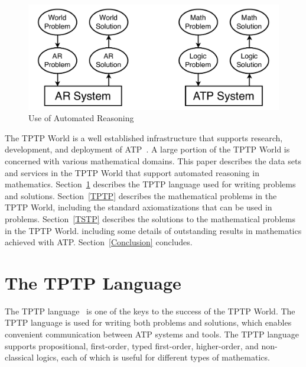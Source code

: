 \documentclass[runningheads]{llncs}
\begin{document}
\begin{figure}[htb]
\centering
\includegraphics[width=1.0\textwidth]{UseOfAR.pdf}
\vspace*{-1em}
\caption{Use of Automated Reasoning}
\label{UseOfAR}
\end{figure}

The TPTP World is a well established infrastructure that supports research, development, and 
deployment of ATP~\cite{Sut10,Sut17}.
A large portion of the TPTP World is concerned with various mathematical domains.
This paper describes the data sets and services in the TPTP World that support automated reasoning
in mathematics.
Section~\ref{Languages} describes the TPTP language used for writing problems and solutions.
Section~\ref{TPTP} describes the mathematical problems in the TPTP World, including the standard 
axiomatizations that can be used in problems.
Section~\ref{TSTP} describes the solutions to the mathematical problems in the TPTP World.
including some details of outstanding results in mathematics achieved with ATP.
Section~\ref{Conclusion} concludes.

\section{The TPTP Language}
\label{Languages}

The TPTP language~\cite{Sut23-IGPL} is one of the keys to the success of the TPTP World.
The TPTP language is used for writing both problems and solutions,
which enables convenient communication between ATP systems and tools.
The TPTP language supports propositional, first-order, typed first-order, higher-order, and
non-classical logics, each of which is useful for different types of mathematics.
\end{document}
